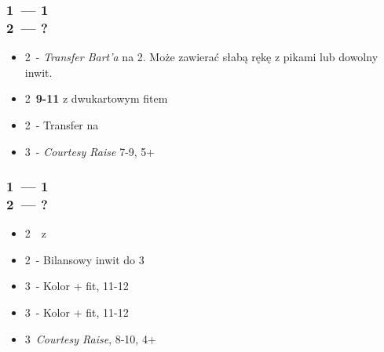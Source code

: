 \documentclass[12pt, a4paper]{article}
\begin{document}
    \subsubsection{1\spades\ --- 1\ntx \\ 2\diams\ --- ?}
    \begin{itemize}
        \item 2\hearts\ - \emph{Transfer Bart'a} na 2\spades.
        Może zawierać słabą rękę z pikami lub dowolny inwit.
        \item 2\spades\ \textbf{9-11} z dwukartowym fitem
        \item 2\nt\ - Transfer na \clubs
        \item 3\diams\ - \emph{Courtesy Raise} 7-9, 5+\diams
    \end{itemize}

    \subsubsection{1\spades\ --- 1\ntx \\ 2\hearts\ --- ?}
    \begin{itemize}
        \item 2\spades\ \soff\ z \spades
        \item 2\nt\ - Bilansowy inwit do 3\nt
        \item 3\clubs\ - Kolor + fit, 11-12
        \item 3\diams\ - Kolor + fit, 11-12
        \item 3\hearts\ \emph{Courtesy Raise}, 8-10, 4+\hearts
    \end{itemize}
\end{document}
